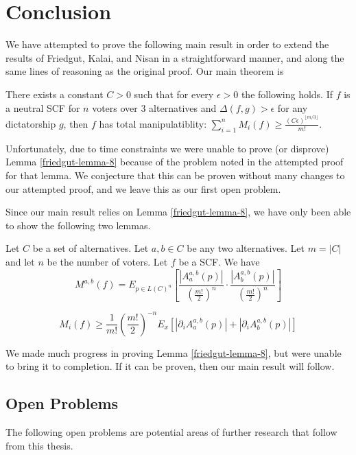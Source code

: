 
\chapter{Conclusion}

	We have attempted to prove the following main result in order to extend the results of Friedgut, Kalai, and Nisan in a straightforward manner, and along the same lines of reasoning as the original proof. Our main theorem is

	\begin{theorem}
		There exists a constant $C > 0$ such that for every $\epsilon > 0$ the following holds. If $f$ is a neutral SCF for $n$ voters over 3 alternatives and $\Delta(f, g) > \epsilon$ for any dictatorship $g$, then $f$ has total manipulatiblity: $\sum^n_{i=1} M_i(f) \ge \frac{(C\epsilon)^{\lfloor m/3 \rfloor}}{m!}$.
	\end{theorem}

	Unfortunately, due to time constraints we were unable to prove (or disprove) Lemma \ref{friedgut-lemma-8} because of the problem noted in the attempted proof for that lemma. We conjecture that this can be proven without many changes to our attempted proof, and we leave this as our first open problem.

	Since our main result relies on Lemma \ref{friedgut-lemma-8}, we have only been able to show the following two lemmas.

	\begin{lemma}
		Let $C$ be a set of alternatives. Let $a, b \in C$ be any two alternatives. Let $m = |C|$ and let $n$ be the number of voters. Let $f$ be a SCF. We have
		\[
			M^{a,b}(f) = E_{p \in L(C)^n} \left[ \frac{|A^{a,b}_a(p)|}{\left(\frac{m!}{2}\right)^n} \cdot \frac{|A^{a,b}_b(p)|}{\left(\frac{m!}{2}\right)^n} \right]
		\]
	\end{lemma}

	\begin{lemma}
		\[
			M_i(f) \ge \frac{1}{m!} \left(\frac{m!}{2}\right)^{-n} E_x \left[|\partial_i A^{a,b}_a(p)| + |\partial_i A^{a,b}_b(p)| \right]
		\]
	\end{lemma}

	We made much progress in proving Lemma \ref{friedgut-lemma-8}, but were unable to bring it to completion. If it can be proven, then our main result will follow.

\section{Open Problems}
	The following open problems are potential areas of further research that follow from this thesis.

